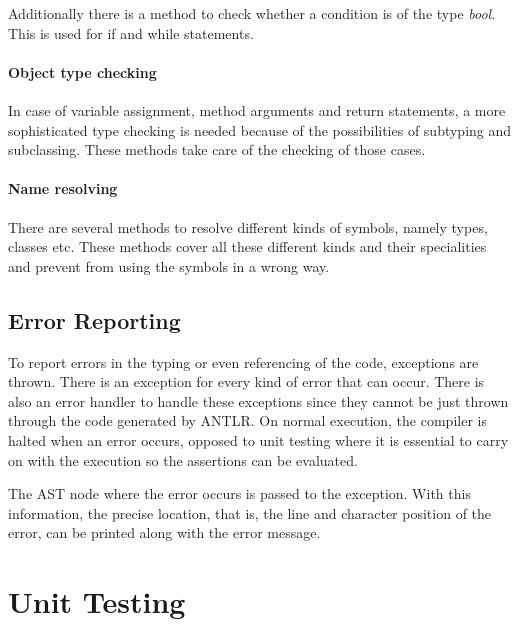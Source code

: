 Additionally there is a method to check whether a condition is of
the type \emph{bool}. This is used for if and while statements.

\paragraph{Object type checking}
In case of variable assignment, method arguments and return statements,
a more sophisticated type checking is needed because of the possibilities
of subtyping and subclassing. These methods take care of the checking
of those cases.

\paragraph{Name resolving}
There are several methods to resolve different kinds of symbols, namely
types, classes etc. These methods cover all these different kinds and their
specialities and prevent from using the symbols in a wrong way.

%
%

\subsection{Error Reporting}

To report errors in the typing or even referencing of the code, exceptions
are thrown. There is an exception for every kind of error that can occur.
There is also an error handler to handle these exceptions since they cannot
be just thrown through the code generated by ANTLR. On normal execution,
the compiler is halted when an error occurs, opposed to unit testing where
it is essential to carry on with the execution so the assertions can be 
evaluated.

The AST node where the error occurs is passed to the exception. With this
information, the precise location, that is, the line and character position
of the error, can be printed along with the error message.

\section{Unit Testing}
